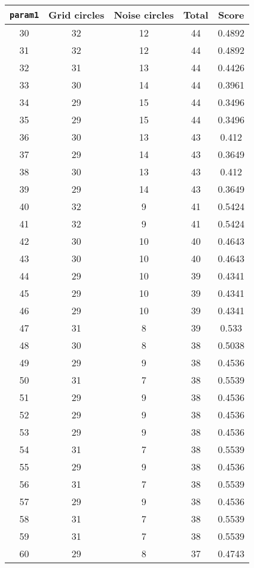 \documentclass[letterpaper, 12pt]{article}
\begin{document}
\begin{longtable}{|c|c|c|c|c|}
\hline
\textbf{\texttt{param1}} & \textbf{Grid circles} & \textbf{Noise circles} & \textbf{Total} & \textbf{Score} \\
\hline
30 & 32 & 12 & 44 & 0.4892 \\
\hline
31 & 32 & 12 & 44 & 0.4892 \\
\hline
32 & 31 & 13 & 44 & 0.4426 \\
\hline
33 & 30 & 14 & 44 & 0.3961 \\
\hline
34 & 29 & 15 & 44 & 0.3496 \\
\hline
35 & 29 & 15 & 44 & 0.3496 \\
\hline
36 & 30 & 13 & 43 & 0.412 \\
\hline
37 & 29 & 14 & 43 & 0.3649 \\
\hline
38 & 30 & 13 & 43 & 0.412 \\
\hline
39 & 29 & 14 & 43 & 0.3649 \\
\hline
40 & 32 & 9 & 41 & 0.5424 \\
\hline
41 & 32 & 9 & 41 & 0.5424 \\
\hline
42 & 30 & 10 & 40 & 0.4643 \\
\hline
43 & 30 & 10 & 40 & 0.4643 \\
\hline
44 & 29 & 10 & 39 & 0.4341 \\
\hline
45 & 29 & 10 & 39 & 0.4341 \\
\hline
46 & 29 & 10 & 39 & 0.4341 \\
\hline
47 & 31 & 8 & 39 & 0.533 \\
\hline
48 & 30 & 8 & 38 & 0.5038 \\
\hline
49 & 29 & 9 & 38 & 0.4536 \\
\hline
50 & 31 & 7 & 38 & 0.5539 \\
\hline
51 & 29 & 9 & 38 & 0.4536 \\
\hline
52 & 29 & 9 & 38 & 0.4536 \\
\hline
53 & 29 & 9 & 38 & 0.4536 \\
\hline
54 & 31 & 7 & 38 & 0.5539 \\
\hline
55 & 29 & 9 & 38 & 0.4536 \\
\hline
56 & 31 & 7 & 38 & 0.5539 \\
\hline
57 & 29 & 9 & 38 & 0.4536 \\
\hline
58 & 31 & 7 & 38 & 0.5539 \\
\hline
59 & 31 & 7 & 38 & 0.5539 \\
\hline
60 & 29 & 8 & 37 & 0.4743 \\
\hline

\end{longtable}
\end{document}
